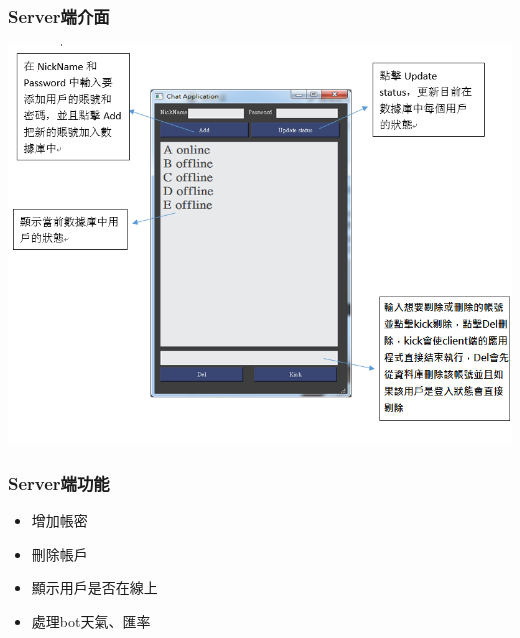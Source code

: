 \documentclass[utf8x]{beamer}
\begin{document}
\begin{frame}
\frametitle{\huge Server端介面} %
\hspace{3.4cm} \includegraphics[scale=0.43]{serverui}
\end{frame}

\begin{frame}[t]
\frametitle{\huge Server端功能} %
\begin{itemize}
\Large \item 增加帳密
\item 刪除帳戶
\item 顯示用戶是否在線上
\item 處理bot天氣、匯率
\end{itemize}
\end{frame}
\end{document}
